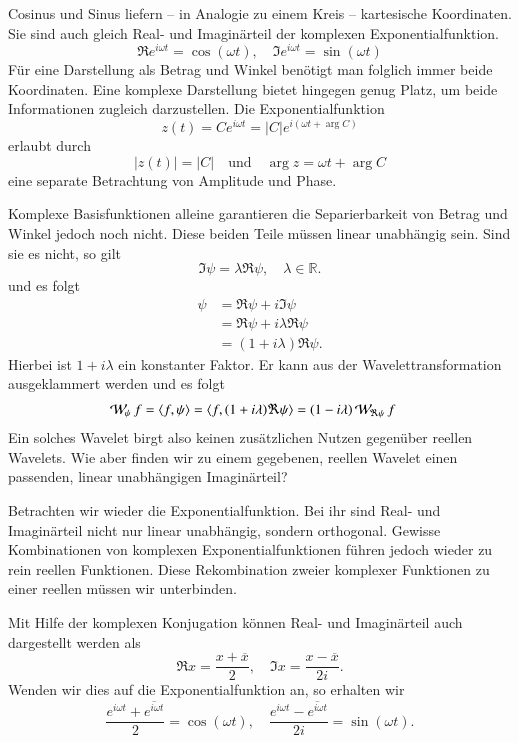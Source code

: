 Cosinus und Sinus liefern -- in Analogie zu einem Kreis -- kartesische Koordinaten. 
Sie sind auch gleich Real- und Imaginärteil der komplexen Exponentialfunktion.
\[
\Re e^{i\omega t} = \cos(\omega t), \quad \Im e^{i\omega t} = \sin(\omega t)
\]
Für eine Darstellung als Betrag und Winkel benötigt man folglich immer beide Koordinaten.
Eine komplexe Darstellung bietet hingegen genug Platz, um beide Informationen zugleich darzustellen.
Die Exponentialfunktion
\[
	z(t) = Ce^{i\omega t} = |C|e^{i(\omega t + \arg C)}
\]
erlaubt durch 
\[
	|z(t)| = |C| 
	\quad \text{und}\quad
	\arg z = \omega t + \arg C
\]
eine separate Betrachtung von Amplitude und Phase.


Komplexe Basisfunktionen alleine garantieren die Separierbarkeit von Betrag und Winkel jedoch noch nicht.
Diese beiden Teile müssen linear unabhängig sein.
Sind sie es nicht, so gilt
\[\Im \psi = \lambda \Re \psi, \quad \lambda \in \mathbb R.\]
und es folgt
\begin{align*}
	\psi &= \Re \psi + i \Im \psi\\
	&= \Re \psi + i\lambda \Re \psi\\
	&= (1+i\lambda) \Re \psi.
\end{align*}
Hierbei ist $1+i\lambda$ ein konstanter Faktor. 
Er kann aus der Wavelettransformation ausgeklammert werden und es folgt
\begin{align*}
	\Wave_\psi f 
	= \langle f, \psi \rangle
	&= \langle f, (1+i\lambda) \Re \psi \rangle
	= (1-i\lambda) \Wave_{\Re\psi}f
\end{align*}
Ein solches Wavelet birgt also keinen zusätzlichen Nutzen gegenüber reellen Wavelets.
Wie aber finden wir zu einem gegebenen, reellen Wavelet einen passenden, linear unabhängigen Imaginärteil?

Betrachten wir wieder die Exponentialfunktion.
Bei ihr sind Real- und Imaginärteil nicht nur linear unabhängig, sondern orthogonal.
Gewisse Kombinationen von komplexen Exponentialfunktionen führen jedoch wieder zu rein reellen Funktionen.
Diese Rekombination zweier komplexer Funktionen zu einer reellen müssen wir unterbinden.

Mit Hilfe der komplexen Konjugation können Real- und Imaginärteil auch dargestellt werden als
\[
\Re x = \frac{x + \overline x}{2} 
,\quad
\Im x = \frac{x - \overline x}{2i}.
\]
Wenden wir dies auf die Exponentialfunktion an, so erhalten wir
\begin{equation}
	\frac{e^{i\omega t} + \overline{e^{i\omega t}}}{2} = \cos(\omega t)
	,\quad
	\frac{e^{i\omega t} - \overline{e^{i\omega t}}}{2i} = \sin(\omega t). \label{complex:euler}
\end{equation}

